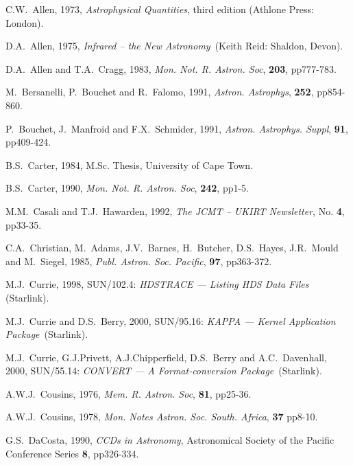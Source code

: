 \documentclass[twoside,11pt]{article}
\newcommand{\xref}[3]{#1}
\begin{document}
\newpage
{}
\begin{thebibliography}{99}

   C.W.~Allen, 1973, {\it Astrophysical Quantities},
   third edition (Athlone Press: London).

   D.A.~Allen, 1975, {\it Infrared -- the New
   Astronomy}\, (Keith Reid: Shaldon, Devon).

   D.A.~Allen and T.A.~Cragg, 1983, {\it Mon. Not. R.
   Astron. Soc}, {\bf 203}, pp777-783.

   M.~Bersanelli, P.~Bouchet and R.~Falomo, 1991,
   {\it Astron. Astrophys}, {\bf 252}, pp854-860.

   P.~Bouchet, J.~Manfroid and F.X.~Schmider, 1991,
   {\it Astron. Astrophys. Suppl}, {\bf 91}, pp409-424.

   B.S.~Carter, 1984, M.Sc. Thesis, University of
   Cape Town.

   B.S.~Carter, 1990, {\it Mon. Not. R. Astron. Soc},
   {\bf 242}, pp1-5.

   M.M.~Casali and T.J.~Hawarden, 1992, {\it The
   JCMT -- UKIRT Newsletter}, No. {\bf 4}, pp33-35.

   C.A.~Christian, M.~Adams, J.V.~Barnes,
   H.~Butcher, D.S.~Hayes, J.R.~Mould and M.~Siegel, 1985, {\it Publ.
   Astron. Soc. Pacific}, {\bf 97}, pp363-372.

   M.J.~Currie, 1998, \xref{SUN/102.4}{sun102}{}: 
   {\it HDSTRACE --- Listing HDS Data Files}\, (Starlink).

   M.J.~Currie and D.S.~Berry, 2000,
   \xref{SUN/95.16}{sun95}{}: {\it KAPPA --- Kernel Application Package}\,
   (Starlink).

   M.J.~Currie, G.J.Privett, A.J.Chipperfield, D.S.~Berry
   and A.C.~Davenhall, 2000, \xref{SUN/55.14}{sun55}{}: {\it  CONVERT ---
   A Format-conversion Package}\, (Starlink).

   A.W.J.~Cousins, 1976, {\it Mem. R. Astron. Soc},
   {\bf 81}, pp25-36.

   A.W.J.~Cousins, 1978, {\it Mon. Notes Astron. Soc.
   South. Africa}, {\bf 37} pp8-10.

   G.S.~DaCosta, 1990, {\it CCDs in Astronomy},
   Astronomical Society of the Pacific Conference Series {\bf 8},
   pp326-334.


\end{thebibliography}
\end{document}
